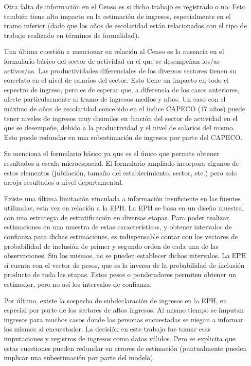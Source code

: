 Otra falta de información en el Censo es si dicho trabajo es registrado o no. Esto también tiene alto impacto en la estimación de ingresos, especialmente en el tramo inferior (dado que los años de escolaridad están relacionados con el tipo de trabajo realizado en términos de formalidad). 

Una última cuestión a mencionar en relación al Censo es la ausencia en el formulario básico del sector de actividad en el que se desempeñan los/as activos/as. Las productividades diferenciales de los diversos sectores tienen su correlato en el nivel de salarios del sector. Esto tiene un impacto en todo el espectro de ingreso, pero es de esperar que, a diferencia de los casos anteriores, afecte particularmente al tramo de ingresos medios y altos. Un caso con el máximo de años de escolaridad concebido en el índice CAPECO (17 años) puede tener niveles de ingresos muy disimiles en función del sector de actividad en el que se desempeñe, debido a la productividad y el nivel de salarios del mismo. Esto puede redundar en una subestimación de ingresos por parte del CAPECO. 

Se menciona el formulario básico ya que es el único que permite obtener resultados a escala microespacial. El formulario ampliado incorpora algunos de estos elementos (jubilación, tamaño del establecimiento, sector, etc.) pero solo arroja resultados a nivel departamental.

Existe una última limitación vinculada a información insuficiente en las fuentes utilizadas, esta vez en relación a la EPH. La EPH se basa en un diseño muestral con una estrategia de estratificación en diversas etapas. Para poder realizar estimaciones en una muestra de estas características, y obtener intervalos de confianza para dichas estimaciones, es indispensable contar con los vectores de probabilidad de inclusión de primer y segundo orden de cada una de las observaciones. Sin los mismos, no se pueden establecer dichos intervalos. La EPH sí cuenta con el vector de pesos, que es la inversa de la probabilidad de inclusión producto de toda las etapas. Estos pesos o ponderadores permiten obtener un estimador, pero no así los intervalos de confianza. 

Por último, existe la sospecha de subdeclaración de ingresos en la EPH, en especial por parte de los sectores de altos ingresos. Al mismo tiempo se imputan ingresos para muchos casos donde las personas encuestadas se niegan a informar los mismos al encuestador. La decisión en este trabajo fue tomar esas imputaciones y registros de ingresos como datos válidos. Pero se explicita que estas cuestiones pueden redundar en errores de estimación (puntualmente pueden implicar una subestimación por parte del modelo).
	
